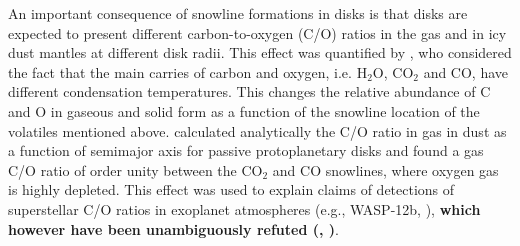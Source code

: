\documentclass[apj]{emulateapj}
\newcommand{\emgr}[1]{\emph{ \color{gray} #1}}
\begin{document}
An important consequence of snowline formations in disks is that disks are expected to present different carbon-to-oxygen (C/O) ratios in the gas and in icy dust mantles at different disk radii. This effect was quantified by  \citet{oberg11}, who considered the fact that the main carries of carbon and oxygen, i.e. H$_2$O, CO$_2$ and CO, have different condensation temperatures. This changes the relative abundance of C and O in gaseous and solid form as a function of the snowline location of the volatiles mentioned above. \citet{oberg11} calculated analytically the C/O ratio in gas in dust as a function of semimajor axis for passive protoplanetary disks and found a gas C/O ratio of order unity between the CO$_2$ and CO snowlines, where oxygen gas is highly depleted. This effect was used to explain claims of detections of superstellar C/O ratios in exoplanet atmospheres (e.g., WASP-12b, \citealt{madhu11}), \textbf{which however have been unambiguously refuted (\citealt{stevenson14}, \citealt{kreidberg15})}.


\end{document}
